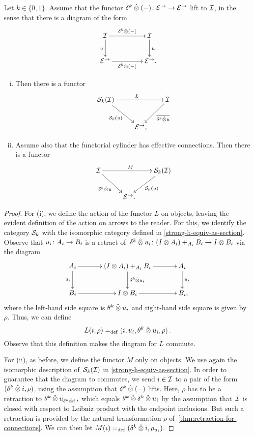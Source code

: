 \documentclass[reqno,10pt,a4paper,oneside,draft]{amsart}
\begin{document}
\begin{lemma} \label{thm:she-to-retract-closure} Let $k \in \{0 , 1\}$.
Assume that the functor $\kcyl \hatotimes (-) \co \catE^\to \to \catE^\to$ lift to $\cal{I}$, in the sense that there is a diagram of the form
\[
\xymatrix@C+2em{
  \cal{I}  \ar[d]_u \ar[r]^{\kcyl \hatotimes (-)} & \cal{I} \ar[d]^{u} \\
  \catE^\to \ar[r]_{\kcyl \hatotimes (-)} & \catE^\to \rlap{.} }
\]
\begin{enumerate}[(i)]
\item Then there is a functor
\[
\xycenter{
  \cal{S}_k(\cal{I}) \ar[dr]_{\cal{S}_k(u)} \ar[rr]^L & & \overline{\cal{I}} \ar[dl]^-{\overline{\kcyl \hatotimes u}} \\
  & \catE^\to \rlap{,} &
}
\]
\item Assume also that the functorial cylinder has effective connections.
Then there is a functor
\[
\xycenter{
 \cal{I} \ar[dr]_{\kcyl \hatotimes u} \ar[rr]^M & & \cal{S}_k(\cal{I}) \ar[dl]^{\cal{S}_k(u)} \\
 & \ \catE^\to \rlap{.}  &
}
\]
\end{enumerate}
\end{lemma}

\begin{proof}
For (i), we define the action of the functor $L$ on objects, leaving the evident definition of the action on arrows to the reader.
For this, we identify the category $\cal{S}_k$ with the isomorphic category defined in \cref{strong-h-equiv-as-section}.
Observe that $u_i \co A_i \to B_i$ is a retract of~$\kcyl \hatotimes u_i \co (\interval \otimes A_i) +_{A_i} B_i \to \interval \otimes B_i$ via the diagram
\[
\xymatrix@C+1em{
  A_i \ar[d]_{u_i} \ar[r] & (\interval \otimes A_i) +_{A_i} B_i \ar[r] \ar[d]^{\kcyl \hatotimes u_i } & A_i \ar[d]^{u_i} \\
  B_i \ar[r] & \interval \otimes B_i \ar[r] & B_i \rlap{,}}
\]
where the left-hand side square is $\thetak \hatotimes u_i$ and right-hand side square is given by $\rho$.
Thus, we can define
\[
  L(i, \rho) \defeq (i, u_i, \thetak \hatotimes u_i, \rho)
\, .\]
Observe that this definition makes the diagram for $L$ commute.

For (ii), as before, we define the functor $M$ only on objects.
We use again the isomorphic description of~$\cal{S}_k(\cal{I})$ in \cref{strong-h-equiv-as-section}.
In order to guarantee that the diagram to commutes, we send $i \in \cal{I}$ to a pair of the form $(\kcyl \hatotimes i, \rho)$, using the assumption that $\kcyl \hatotimes (-)$ lifts.
Here, $\rho$ has to be a retraction to $\thetak \hatotimes u_{\kcyl \hatotimes i}\, ,$ which equals $\thetak \hatotimes \kcyl \hatotimes u_i$ by the assumption that~$\cal{I}$ is closed with respect to Leibniz product with the endpoint inclusions.
But such a retraction is provided by the natural transformation $\rho$ of~\cref{thm:retraction-for-connections}.
We can then let $M(i) \defeq (\kcyl \hatotimes i, \rho_{u_i})$.
\end{proof}
\end{document}
